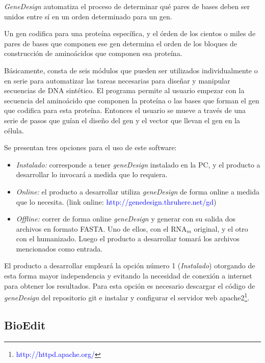 \documentclass[12pt,a4paper,spanish]{article}
\begin{document}
		\par \emph{GeneDesign} automatiza el proceso de determinar qué pares de bases deben ser unidos entre sí en un 			orden determinado para un gen. 

		Un gen codifica para una proteína específica, y el órden de los cientos o miles de pares de bases que 			
		componen ese gen determina el orden de los bloques de construcción de aminoácidos que componen esa proteína. 

		\par Básicamente, consta de seis módulos que pueden ser utilizados individualmente o en serie para automatizar 			las tareas necesarias para diseñar y manipular secuencias de DNA sintético. El programa permite al usuario empezar 			con la secuencia del aminoácido que componen la proteína o las bases que forman el gen que codifica para esta 			proteína. Entonces el usuario se mueve a través de una serie de pasos que guían el diseño del gen y el vector que 			llevan el gen en la célula. 

		\par Se presentan tres opciones para el uso de este software:
		\begin{itemize}
			\item \emph{Instalado:} corresponde a tener \emph{geneDesign} instalado en la PC, y el producto a desarrollar 										lo invocará a medida que lo requiera.
			\item \emph{Online:} el producto a desarrollar utiliza \emph{geneDesign} de forma online a medida que lo 									 necesita. (link online: \textcolor{blue}{http://genedesign.thruhere.net/gd})
			\item \emph{Offline:} correr de forma online \emph{geneDesign} y generar con su salida dos archivos en formato 									  FASTA. Uno de ellos, con el RNA$_m$ original, y el otro con el humanizado. Luego el 									  producto a desarrollar tomará los archivos mencionados como entrada.
		\end{itemize}
	
		\par El producto a desarrollar empleará la opción número 1 (\emph{Instalado}) otorgando de esta forma mayor
 		independencia y evitando la necesidad de conexión a internet para obtener los resultados. Para esta opción es 			necesario descargar el código de \emph{geneDesign} del repositorio git e instalar y configurar el servidor web 			apache2\footnote{\textcolor{blue}{http://httpd.apache.org/}}.

	\subsection{BioEdit}		
\end{document}
